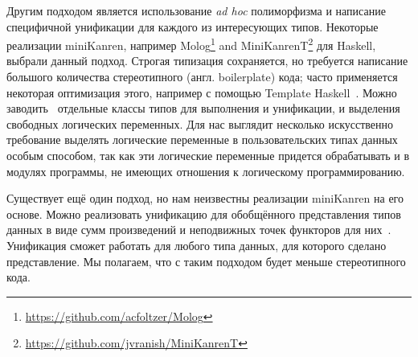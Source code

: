 Другим подходом является использование \emph{ad hoc} полиморфизма и написание специфичной унификации для каждого из интересующих типов.
Некоторые реализации miniKanren, например  Molog\footnote{\url{https://github.com/acfoltzer/Molog}} and
MiniKanrenT\footnote{\url{https://github.com/jvranish/MiniKanrenT}} для Haskell, выбрали данный подход.
Строгая типизация сохраняется, но требуется написание большого количества стереотипного (англ. boilerplate) кода; часто применяется некоторая оптимизация этого, например с помощью
Template Haskell~\cite{SheardTMH}.
Можно заводить~\cite{TypedLogicalVariables} отдельные классы типов для выполнения и унификации, и выделения свободных логических переменных. %
Для нас выглядит несколько искусственно требование выделять логические переменные в пользовательских типах данных особым способом, так как эти логические переменные придется обрабатывать и в модулях программы, не имеющих отношения к логическому программированию.


Существует ещё один подход, но нам неизвестны реализации miniKanren  на его основе.
Можно реализовать унификацию для обобщённого представления типов данных в виде сумм произведений и неподвижных точек функторов для них~\cite{InstantGenerics, ALaCarte}.
Унификация сможет работать для любого типа данных, для которого сделано представление.
Мы полагаем, что с таким подходом будет меньше стереотипного кода.

\def\adhoc{\emph{ad hoc}}

